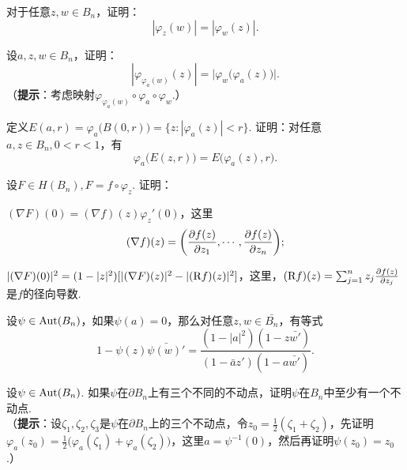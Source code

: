 \begin{xiti}
\item 对于任意$z,w\in B_n$，证明：
\[|\varphi_z(w)|=|\varphi_w(z)|.\]
\item 设$a,z,w\in B_n$，证明：
\[|\varphi_{\varphi_a(w)}(z)|=\big|\varphi_w\big(\varphi_a(z)\big)\big|.\]
（\textbf{提示}：考虑映射$\varphi_{\varphi_a(w)}\circ\varphi_a\circ\varphi_w$.）
\item 定义$E(a,r)=\varphi_a\big(B(0,r)\big)=\{z:|\varphi_a(z)|<r\}$. 证明：对任意$a,z\in B_n,0<r<1$，有
    \[\varphi_a\big(E(z,r)\big)=E\big(\varphi_a(z),r\big).\]
\item 设$F\in H(B_n),F=f\circ\varphi_z$. 证明：
\begin{enuma}
  \item $(\nabla F)(0)=(\nabla f)(z)\varphi_z'(0)$，这里
  \[(\nabla f)(z)=\bigg(\frac{\partial f(z)}{\partial z_1},\cdots,\frac{\partial f(z)}{\partial z_n}\bigg);\]
  \item $|(\nabla F)(0)|^2=(1-|z|^2)[|(\nabla F)(z)|^2-|(\textrm Rf)(z)|^2]$，这里，$(\textrm Rf)(z)=\sum_{j=1}^nz_j\frac{\partial f(z)}{\partial z_j}$是$f$的径向导数.
\end{enuma}
\item 设$\psi\in\operatorname{Aut}(B_n)$，如果$\psi(a)=0$，那么对任意$z,w\in\bar{B_n}$，有等式
\[1-\psi(z)\bar{\psi(w)'}=\frac{(1-|a|^2)(1-z\bar{w'})}
{(1-\bar az')(1-a\bar {w'})}.\]
\item 设$\psi\in\operatorname{Aut}(B_n)$. 如果$\psi$在$\partial B_n$上有三个不同的不动点，证明$\psi$在$B_n$中至少有一个不动点.\\
（\textbf{提示}：设$\zeta_1,\zeta_2,\zeta_3$是$\psi$在$\partial B_n$上的三个不动点，令$z_0=\frac12(\zeta_1+\zeta_2)$，先证明$\varphi_a(z_0)=\frac12\big(\varphi_a(\zeta_1)+\varphi_a(\zeta_2)\big)$，这里$a=\psi^{-1}(0)$，然后再证明$\psi(z_0)=z_0$.）
\end{xiti}
